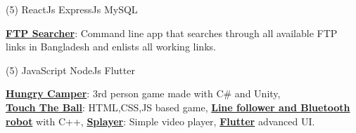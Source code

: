 \documentclass[mm]{simple_style}
\let\oldhref\href
\renewcommand{\href}[2]{\oldhref{#1}{\bfseries#2}}
\begin{document}
\begin{resume}
\vspace{-4mm}
\begin{tasks}[style=itemize ,label=\textcolor{gray}{$\bullet$}](5)
\task ReactJs
\task ExpressJs
\task MySQL
\end{tasks}
\vspace{-3.5mm}
\href{https://github.com/Sourav9063/ftp_searcher}{FTP Searcher}: Command line app that searches through all available FTP links in Bangladesh and enlists all working links.
\vspace{-4mm}
\begin{tasks}[style=itemize ,label=\textcolor{gray}{$\bullet$}](5)
\task[] \hspace
\task[] \hspace
\task JavaScript 
\task NodeJs 
\task Flutter
\end{tasks}
\vspace{-3.5mm}
\href{https://github.com/Sourav9063/Hungry-Camper-scripts}{Hungry Camper}: 3rd person game made with  C{\lserif\#} and Unity,\\ \href{https://sourav9063.github.io/Touch-The-Ball/}{Touch The Ball}: HTML,CSS,JS based game, \href{https://github.com/Sourav9063/Arduino-projects-linefollower-git}{Line follower and Bluetooth robot} with C++, \href{https://github.com/Sourav9063/splayer}{Splayer}: Simple video player, \href{https://github.com/Sourav9063/flutter_learning}{Flutter} advanced UI. \hspace\\
\vspace{-3.5ex}
\sectionline
\vspace{-3mm}

\end{resume}
\end{document}
